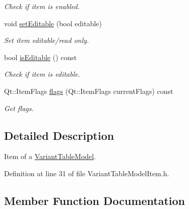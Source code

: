 \begin{DoxyCompactItemize}
\begin{DoxyCompactList}\small\item\em Check if item is enabled. \end{DoxyCompactList}\item 
void \hyperlink{class_mdt_1_1_item_model_1_1_variant_table_model_item_a6848108f8c1dd778d273b907f06cb4a4}{set\+Editable} (bool editable)
\begin{DoxyCompactList}\small\item\em Set item editable/read only. \end{DoxyCompactList}\item 
bool \hyperlink{class_mdt_1_1_item_model_1_1_variant_table_model_item_af784c4ac31151ab9912348613067bba0}{is\+Editable} () const \hypertarget{class_mdt_1_1_item_model_1_1_variant_table_model_item_af784c4ac31151ab9912348613067bba0}{}\label{class_mdt_1_1_item_model_1_1_variant_table_model_item_af784c4ac31151ab9912348613067bba0}

\begin{DoxyCompactList}\small\item\em Check if item is editable. \end{DoxyCompactList}\item 
Qt\+::\+Item\+Flags \hyperlink{class_mdt_1_1_item_model_1_1_variant_table_model_item_af8855039323cadbeca2d557fa3424618}{flags} (Qt\+::\+Item\+Flags current\+Flags) const 
\begin{DoxyCompactList}\small\item\em Get flags. \end{DoxyCompactList}\end{DoxyCompactItemize}


\subsection{Detailed Description}
Item of a \hyperlink{class_mdt_1_1_item_model_1_1_variant_table_model}{Variant\+Table\+Model}. 

Definition at line 31 of file Variant\+Table\+Model\+Item.\+h.



\subsection{Member Function Documentation}
